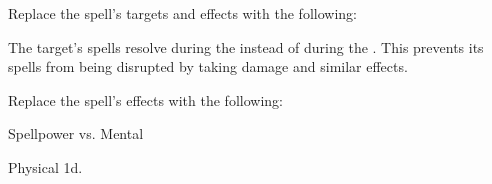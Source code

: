 


Replace the spell's targets and effects with the following:
\begin{spellcontent}

\begin{augmenttargetinginfo}



\end{augmenttargetinginfo}


\begin{augmenteffects}



\spelleffect
The target's spells resolve during the  instead of during the .
This prevents its spells from being disrupted by taking damage and similar effects.








\end{augmenteffects}

\end{spellcontent}








Replace the spell's effects with the following:
\begin{spellcontent}

\begin{augmenteffects}




\begin{spellattack}{Spellpower vs. Mental}


\spellsuccess Physical  \plus1d.


\end{spellattack}





\end{augmenteffects}

\end{spellcontent}





